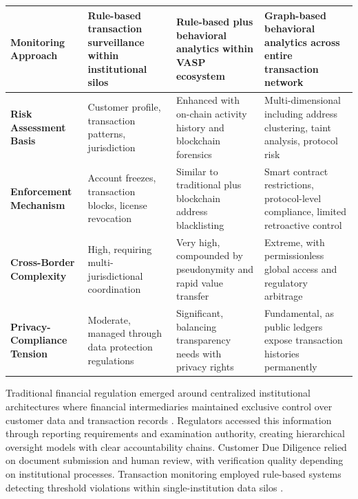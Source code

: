 \documentclass[conference,compsoc]{IEEEtran}
\begin{document}
\begin{table}[t]
\begin{tabularx}{\textwidth}{lXXX}
\midrule
\textbf{Monitoring Approach} & Rule-based transaction surveillance within institutional silos \cite{drezewski2015applicationsocialnetwork} & Rule-based plus behavioral analytics within VASP ecosystem \cite{weber2019antimoneylaunderingbitcoin} & Graph-based behavioral analytics across entire transaction network \cite{wu2023tracerscalablegraphbased,azad2025machinelearningblockchain} \\
\midrule
\textbf{Risk Assessment Basis} & Customer profile, transaction patterns, jurisdiction \cite{financialactiontaskforcefatf2012internationalstandardscombating} & Enhanced with on-chain activity history and blockchain forensics \cite{moser2014riskscoringbitcoin} & Multi-dimensional including address clustering, taint analysis, protocol risk \cite{moser2013inquirymoneylaundering,difrancescomaesa2018datadrivenanalysisbitcoin} \\
\midrule
\textbf{Enforcement Mechanism} & Account freezes, transaction blocks, license revocation \cite{financialactiontaskforcefatf2012internationalstandardscombating} & Similar to traditional plus blockchain address blacklisting \cite{force2021updatedguidanceriskbased} & Smart contract restrictions, protocol-level compliance, limited retroactive control \cite{szabo1997formalizingsecuringrelationships,luu2016makingsmartcontracts} \\
\midrule
\textbf{Cross-Border Complexity} & High, requiring multi-jurisdictional coordination \cite{financialactiontaskforcefatf2012internationalstandardscombating} & Very high, compounded by pseudonymity and rapid value transfer \cite{force2021opportunitieschallengesnew,salami2021challengesapproachesregulating} & Extreme, with permissionless global access and regulatory arbitrage \cite{bonneau2015sokresearchperspectives,werbach2018trustverifywhy} \\
\midrule
\textbf{Privacy-Compliance Tension} & Moderate, managed through data protection regulations \cite{zetsche2017fintechtechfinregulatory} & Significant, balancing transparency needs with privacy rights \cite{pocher2022privacytransparencycbdcs} & Fundamental, as public ledgers expose transaction histories permanently \cite{androulaki2013evaluatinguserprivacy,koshy2014analysisanonymitybitcoin} \\
\bottomrule
\end{tabularx}
\end{table}

Traditional financial regulation emerged around centralized institutional architectures where financial intermediaries maintained exclusive control over customer data and transaction records \cite{arner2016fintechregtechreconceptualization,zetsche2017fintechtechfinregulatory}. Regulators accessed this information through reporting requirements and examination authority, creating hierarchical oversight models with clear accountability chains. Customer Due Diligence relied on document submission and human review, with verification quality depending on institutional processes. Transaction monitoring employed rule-based systems detecting threshold violations within single-institution data silos \cite{drezewski2015applicationsocialnetwork}.
\end{document}
